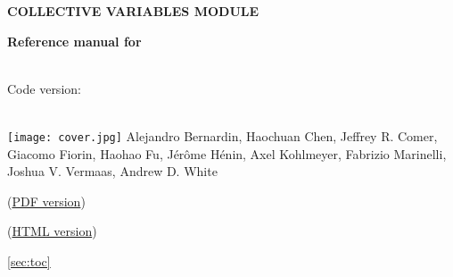 \documentclass[11pt]{article}
\begin{document}
\ifdefined\HCode

\fi



\ifdefined\HCode
{}
\fi

\begin{titlepage}

  \noindent\colorbox{background-color}{
    \begin{minipage}{1.0\textwidth}

        $\,$\\

        \noindent\textsf{\bfseries\Huge COLLECTIVE VARIABLES MODULE\\}

        \noindent\textsf{\bfseries\Huge Reference manual for \MDENGINE{} }

        \noindent\textsf{\\Code version: \cvversion\\}

      \end{minipage}}

  \ifdefined\HCode
  \\
  \else
  \texttt{[image: cover.jpg]}
  \fi
  \textsf{\large Alejandro Bernardin, Haochuan Chen, Jeffrey R.{} Comer, Giacomo Fiorin, Haohao Fu, J\'er\^ome H\'enin, Axel Kohlmeyer, Fabrizio Marinelli, Joshua V.{} Vermaas, Andrew D.{} White}

\ifdefined\HCode
\noindent{}(\href{https://colvars.github.io/pdf/colvars-refman-\mdengine.pdf}{PDF version})
\else
\par
\noindent{}(\href{https://colvars.github.io/colvars-refman-\mdengine/colvars-refman-\mdengine.html}{HTML version})
\fi



\end{titlepage}


\newpage
\label{sec:toc}%
\ifdefined\HCode{}\ref{sec:toc}\fi%
\tableofcontents
\newpage


\newcommand{\key}[5]{%
  \index{#2!\texttt{#1}}%
  \colorbox{cvkeyword-background-color}{%
    {\bf Keyword \large \tt #1}}~$\langle\,$#3$\,\rangle$\\%
  {\bf Context: } #2 \\%
  {\bf Acceptable values: } #4 \\%
  {\bf Description: } #5%
}
\end{document}

